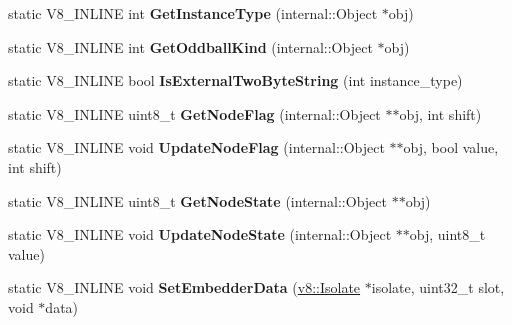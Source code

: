 \begin{DoxyCompactItemize}
\item 
\hypertarget{classv8_1_1internal_1_1_internals_a7262da07b4ed930b2ccf2d83ba7b4b56}{}static V8\+\_\+\+I\+N\+L\+I\+N\+E int {\bfseries Get\+Instance\+Type} (internal\+::\+Object $\ast$obj)\label{classv8_1_1internal_1_1_internals_a7262da07b4ed930b2ccf2d83ba7b4b56}

\item 
\hypertarget{classv8_1_1internal_1_1_internals_a2891c298313f75dc8fe1c7ee6877412e}{}static V8\+\_\+\+I\+N\+L\+I\+N\+E int {\bfseries Get\+Oddball\+Kind} (internal\+::\+Object $\ast$obj)\label{classv8_1_1internal_1_1_internals_a2891c298313f75dc8fe1c7ee6877412e}

\item 
\hypertarget{classv8_1_1internal_1_1_internals_afbf930e9dfde745b54e1e7e03b5b96c8}{}static V8\+\_\+\+I\+N\+L\+I\+N\+E bool {\bfseries Is\+External\+Two\+Byte\+String} (int instance\+\_\+type)\label{classv8_1_1internal_1_1_internals_afbf930e9dfde745b54e1e7e03b5b96c8}

\item 
\hypertarget{classv8_1_1internal_1_1_internals_aa7df51a3da3e021e2bd4426461e6d1fb}{}static V8\+\_\+\+I\+N\+L\+I\+N\+E uint8\+\_\+t {\bfseries Get\+Node\+Flag} (internal\+::\+Object $\ast$$\ast$obj, int shift)\label{classv8_1_1internal_1_1_internals_aa7df51a3da3e021e2bd4426461e6d1fb}

\item 
\hypertarget{classv8_1_1internal_1_1_internals_a868ffed15d660ac6959597e45a353d6e}{}static V8\+\_\+\+I\+N\+L\+I\+N\+E void {\bfseries Update\+Node\+Flag} (internal\+::\+Object $\ast$$\ast$obj, bool value, int shift)\label{classv8_1_1internal_1_1_internals_a868ffed15d660ac6959597e45a353d6e}

\item 
\hypertarget{classv8_1_1internal_1_1_internals_a76c388eb1d813144512b0af2d1c5ac7b}{}static V8\+\_\+\+I\+N\+L\+I\+N\+E uint8\+\_\+t {\bfseries Get\+Node\+State} (internal\+::\+Object $\ast$$\ast$obj)\label{classv8_1_1internal_1_1_internals_a76c388eb1d813144512b0af2d1c5ac7b}

\item 
\hypertarget{classv8_1_1internal_1_1_internals_a0f37a58646403a6a39f925006a98a0d0}{}static V8\+\_\+\+I\+N\+L\+I\+N\+E void {\bfseries Update\+Node\+State} (internal\+::\+Object $\ast$$\ast$obj, uint8\+\_\+t value)\label{classv8_1_1internal_1_1_internals_a0f37a58646403a6a39f925006a98a0d0}

\item 
\hypertarget{classv8_1_1internal_1_1_internals_abe73d79832edf012f30a94ccc4b293d2}{}static V8\+\_\+\+I\+N\+L\+I\+N\+E void {\bfseries Set\+Embedder\+Data} (\hyperlink{classv8_1_1_isolate}{v8\+::\+Isolate} $\ast$isolate, uint32\+\_\+t slot, void $\ast$data)\label{classv8_1_1internal_1_1_internals_abe73d79832edf012f30a94ccc4b293d2}


\end{DoxyCompactItemize}
